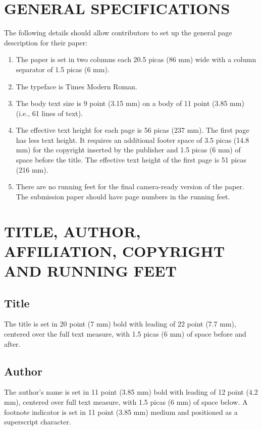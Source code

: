 \documentclass{ecai}
\begin{document}
\section{GENERAL SPECIFICATIONS}
The following details should allow contributors to set up the general
page description for their paper:

\begin{enumerate}
\item The paper is set in two columns each 20.5 picas (86 mm) wide
  with a column separator of 1.5 picas (6 mm).

\item The typeface is Times Modern Roman.

\item The body text size is 9 point (3.15 mm) on a body of 11
point (3.85 mm) (i.e., 61 lines of text).

\item The effective text height for each page is 56 picas (237 mm).
The first page has less text height. It requires an additional footer
space of 3.5 picas (14.8 mm) for the copyright inserted by the publisher
and 1.5 picas (6 mm) of space before the title.
The effective text height of the first page is 51 picas (216 mm).

\item There are no running feet for the final camera-ready version of the
paper. The submission paper should have page numbers in the running feet.

\end {enumerate}

\section{TITLE, AUTHOR, AFFILIATION, COPYRIGHT
AND RUNNING FEET}
\subsection{Title}
The title is set in 20 point (7 mm) bold with leading of 22 point (7.7
mm), centered over the full text measure, with 1.5 picas (6 mm) of
space before and after.

\subsection{Author}
The author's name is set in 11 point (3.85 mm) bold with leading of 12
point (4.2 mm), centered over full text measure, with 1.5 picas (6 mm)
of space below. A footnote indicator is set in 11 point (3.85 mm)
medium and positioned as a superscript character.
\end{document}
